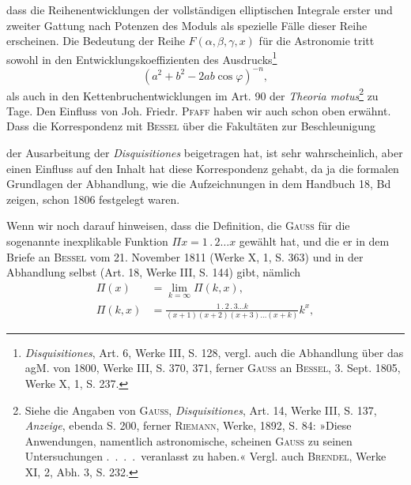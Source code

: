dass die Reihenentwicklungen der vollständigen elliptischen Integrale erster
und zweiter Gattung nach Potenzen des Moduls als spezielle Fälle dieser Reihe
erscheinen. Die Bedeutung der Reihe \(F(\alpha,\beta,\gamma,x)\) für die Astronomie tritt
sowohl in den Entwicklungskoeffizienten des Ausdrucks\footnote{\textit{Disquisitiones}, Art. 6, Werke III, S. 128, vergl. auch die Abhandlung über das agM. von 1800, Werke III, S. 370, 371, ferner \textsc{Gauss} an \textsc{Bessel}, 3. Sept. 1805, Werke X, 1, S. 237.}
\[
(a^2+b^2-2ab\cos\varphi)^{-n},
\]
als auch in den Kettenbruchentwicklungen im Art. 90 der \textit{Theoria motus}\footnote{Siehe die Angaben von \textsc{Gauss}, \textit{Disquisitiones}, Art. 14, Werke III, S. 137, \textit{Anzeige}, ebenda S. 200, ferner \textsc{Riemann}, Werke, 1892, S. 84: »Diese Anwendungen, namentlich astronomische, scheinen \textsc{Gauss} zu seinen Untersuchungen \mbox{.\ .\ .\ .}\ veranlasst zu haben.« Vergl. auch \textsc{Brendel}, Werke XI, 2, Abh. 3, S. 232.}
zu Tage. Den Einfluss von Joh. Friedr. \textsc{Pfaff} haben wir auch schon oben
erwähnt. Dass die Korrespondenz mit \textsc{Bessel} über die Fakultäten zur Beschleunigung\par
\clearpage{}
\noindent der Ausarbeitung der \textit{Disquisitiones} beigetragen hat, ist sehr
wahrscheinlich, aber einen Einfluss auf den Inhalt hat diese Korrespondenz
 gehabt, da ja die formalen Grundlagen der Abhandlung, wie
die Aufzeichnungen in dem Handbuch 18, Bd zeigen, schon 1806 festgelegt
waren.
\par
Wenn wir noch darauf hinweisen, dass die Definition, die \textsc{Gauss} für die
sogenannte inexplikable Funktion \(\Pi x=1\mathbin{.}2\ldots x\) gewählt hat, und die er in
dem Briefe an \textsc{Bessel} vom 21. November 1811 (Werke X, 1, S. 363) und in
der Abhandlung selbst (Art. 18, Werke III, S. 144) gibt, nämlich
\begingroup\makeatletter\tagsleft@true\let\veqno\leqno\makeatother
\begin{equation*}
\begin{aligned}
\Pi(x)&=\lim_{k=\infty}\Pi(k,x),\\
\Pi(k,x)&=\frac{1\mathbin{.}2\mathbin{.}3\ldots k}{(x+1)(x+2)(x+3)\ldots(x+k)}k^x,
\end{aligned}\tag{10}
\end{equation*}\endgroup
